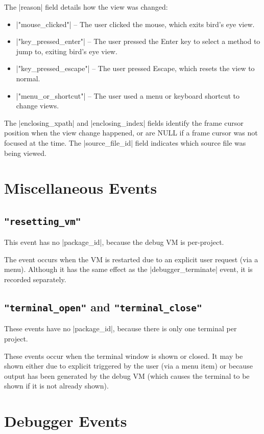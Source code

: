 \documentclass{report}
\begin{document}
The |reason| field details how the view was changed:
\begin{itemize}
\item |"mouse_clicked"| -- The user clicked the mouse, which exits bird's eye view.
\item |"key_pressed_enter"| -- The user pressed the Enter key to select a method to jump to, exiting bird's eye view.
\item |"key_pressed_escape"| -- The user pressed Escape, which resets the view to normal.
\item |"menu_or_shortcut"| -- The user used a menu or keyboard shortcut to change views.
\end{itemize}

The |enclosing_xpath| and |enclosing_index| fields identify the frame cursor position when the view change happened,
or are NULL if a frame cursor was not focused at the time.  The |source_file_id| field indicates which source file was being viewed.


\section{Miscellaneous Events}

\subsection{\lstinline!"resetting_vm"!}

This event has no |package_id|, because the debug VM is per-project.

The event occurs when the VM is restarted due to an explicit user request (via
a menu).  Although it has the same effect as the |debugger_terminate| event,
it is recorded separately.

\subsection{\lstinline!"terminal_open"! and \lstinline!"terminal_close"!}

These events have no |package_id|, because there is only one terminal
per project.

These events occur when the terminal window is shown or closed.  It
may be shown either due to explicit triggered by the user (via a menu
item) or because output has been generated by the debug VM (which
causes the terminal to be shown if it is not already shown).

\section{Debugger Events}
\end{document}
